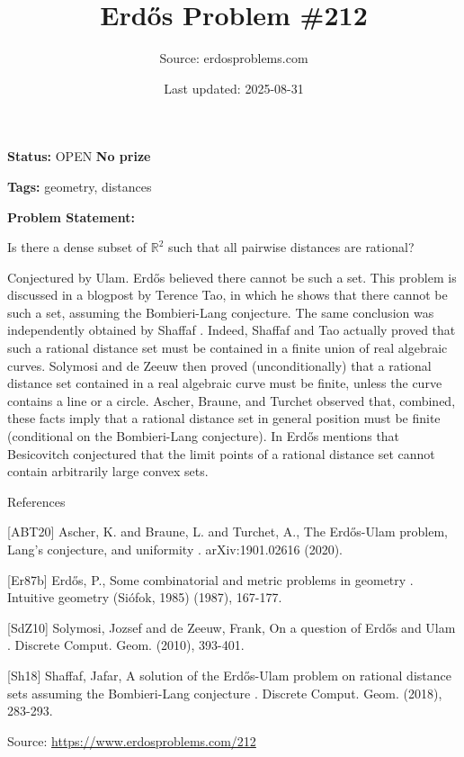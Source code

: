 \documentclass{article}
\title{Erd\H{o}s Problem \#212}
\date{Last updated: 2025-08-31}
\author{Source: erdosproblems.com}
\begin{document}
\maketitle

\noindent\textbf{Status:} OPEN \quad \textbf{No prize}

\noindent\textbf{Tags:} geometry, distances

\medskip

\noindent\textbf{Problem Statement:}

Is there a dense subset of $\mathbb{R}^2$ such that all pairwise distances are rational?




Conjectured by Ulam. Erd\H{o}s believed there cannot be such a set. This problem is discussed in a blogpost by Terence Tao, in which he shows that there cannot be such a set, assuming the Bombieri-Lang conjecture. The same conclusion was independently obtained by Shaffaf \cite{Sh18}. Indeed, Shaffaf and Tao actually proved that such a rational distance set must be contained in a finite union of real algebraic curves. Solymosi and de Zeeuw \cite{SdZ10} then proved (unconditionally) that a rational distance set contained in a real algebraic curve must be finite, unless the curve contains a line or a circle. Ascher, Braune, and Turchet \cite{ABT20} observed that, combined, these facts imply that a rational distance set in general position must be finite (conditional on the Bombieri-Lang conjecture). In \cite{Er87b} Erd\H{o}s mentions that Besicovitch conjectured that the limit points of a rational distance set cannot contain arbitrarily large convex sets.




References

[ABT20] Ascher, K. and Braune, L. and Turchet, A., The Erd\H{o}s-Ulam problem, Lang's conjecture, and uniformity . arXiv:1901.02616 (2020).

[Er87b] Erd\H{o}s, P., Some combinatorial and metric problems in geometry . Intuitive geometry (Si\'{o}fok, 1985) (1987), 167-177.

[SdZ10] Solymosi, Jozsef and de Zeeuw, Frank, On a question of Erd\H{o}s and Ulam . Discrete Comput. Geom. (2010), 393-401.

[Sh18] Shaffaf, Jafar, A solution of the Erd\H{o}s-Ulam problem on rational distance sets assuming the Bombieri-Lang conjecture . Discrete Comput. Geom. (2018), 283-293.


\bigskip
\noindent\small{Source: \url{https://www.erdosproblems.com/212}}
\end{document}
